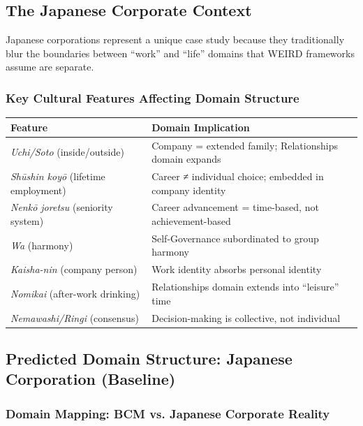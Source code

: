 \subsection{The Japanese Corporate Context}

Japanese corporations represent a unique case study because they traditionally blur the boundaries between ``work'' and ``life'' domains that WEIRD frameworks assume are separate.

\subsubsection{Key Cultural Features Affecting Domain Structure}

\begin{center}
\begin{tabular}{@{}lp{7cm}@{}}
\toprule
\textbf{Feature} & \textbf{Domain Implication} \\
\midrule
\textit{Uchi/Soto} (inside/outside) & Company = extended family; Relationships domain expands \\
\textit{Shūshin koyō} (lifetime employment) & Career ≠ individual choice; embedded in company identity \\
\textit{Nenkō joretsu} (seniority system) & Career advancement = time-based, not achievement-based \\
\textit{Wa} (harmony) & Self-Governance subordinated to group harmony \\
\textit{Kaisha-nin} (company person) & Work identity absorbs personal identity \\
\textit{Nomikai} (after-work drinking) & Relationships domain extends into ``leisure'' time \\
\textit{Nemawashi/Ringi} (consensus) & Decision-making is collective, not individual \\
\bottomrule
\end{tabular}
\end{center}

\subsection{Predicted Domain Structure: Japanese Corporation (Baseline)}

\subsubsection{Domain Mapping: BCM vs. Japanese Corporate Reality}

